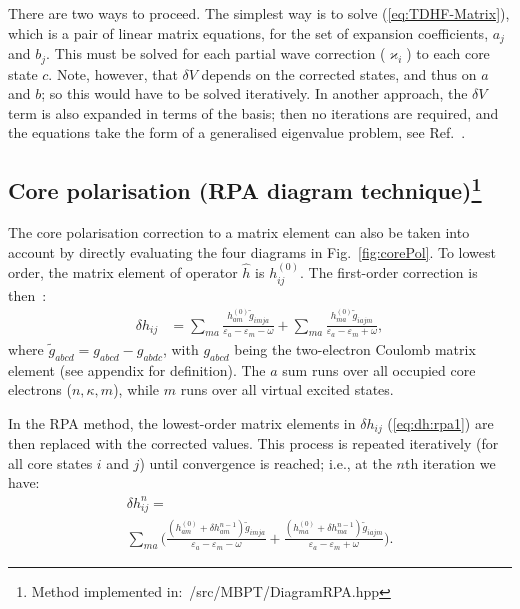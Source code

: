\documentclass[10pt,twocolumn,a4paper]{article}%
\def\en{\ensuremath{\varepsilon}}
\renewcommand{\k}{\ensuremath{\kappa}}
\begin{document}
There are two ways to proceed.
The simplest way is to solve (\ref{eq:TDHF-Matrix}), which is a pair of linear matrix equations, for the set of expansion coefficients, $a_j$ and $b_j$.
This must be solved for each partial wave correction ($\varkappa_i$) to each core state $c$.
Note, however, that $\delta V$ depends on the corrected states, and thus on $a$ and $b$; so this would have to be solved iteratively.
In another approach, the $\delta V$ term is also expanded in terms of the basis; then no iterations are required, and the equations take the form of a generalised eigenvalue problem, see Ref.~\cite{Johnson1989}.





\subsection[Core polarisation (RPA diagram technique)]{Core polarisation (RPA diagram technique)\footnote{Method implemented in:~/src/MBPT/DiagramRPA.hpp}}

The core polarisation correction to a matrix element can also be taken into account by directly evaluating the four diagrams in Fig.~\ref{fig:corePol}.
To lowest order, the matrix element of operator $\hat h$ is $h_{ij}^{(0)}$.
The first-order correction is then~\cite{Lindgren1986}:
\begin{align}
\delta h_{ij} &=
\sum_{ma}\frac{h_{am}^{(0)}\widetilde g_{imja}}{\en_a - \en_m - \omega}
+ \sum_{ma}\frac{h_{ma}^{(0)}\widetilde g_{iajm}}{\en_a - \en_m + \omega},
\label{eq:dh:rpa1}
\end{align}
where
$ \widetilde g_{abcd} =  g_{abcd} -  g_{abdc}$, with
$g_{abcd}$ being the two-electron Coulomb matrix element (see appendix for definition).
The $a$ sum runs over all occupied core electrons ($n,\k,m$), while $m$ runs over all virtual excited states.

In the RPA method, the lowest-order matrix elements in $\delta h_{ij}$ (\ref{eq:dh:rpa1}) are then replaced with the corrected values. This process is repeated iteratively (for all core states $i$ and $j$) until convergence is reached; i.e., at the $n$th iteration we have:
\begin{multline}
\delta h_{ij}^{n} = \\
\sum_{ma}\Bigg(\frac{(h_{am}^{(0)}+\delta h_{am}^{n-1})\widetilde g_{imja}}{\en_a - \en_m - \omega}
+ \frac{(h_{ma}^{(0)}+\delta h_{ma}^{n-1})\widetilde g_{iajm}}{\en_a - \en_m + \omega}\Bigg).
\end{multline}
\end{document}
